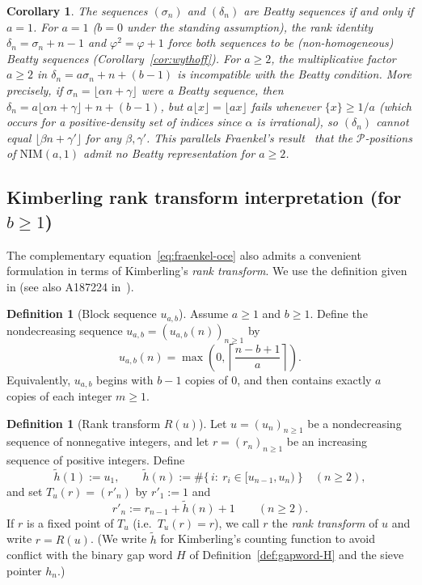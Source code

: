 \documentclass[11pt]{article}
\numberwithin{equation}{section}
\theoremstyle{plain}
\newtheorem{corollary}[theorem]{Corollary}
\theoremstyle{definition}
\newtheorem{definition}[theorem]{Definition}
\theoremstyle{remark}
\begin{document}
\begin{corollary}\label{cor:beatty-dichotomy}
The sequences $(\sigma_n)$ and $(\delta_n)$ are Beatty sequences if and only if $a=1$.
For $a=1$ ($b=0$ under the standing assumption), the rank identity $\delta_n=\sigma_n+n-1$
and $\varphi^2=\varphi+1$ force both sequences to be (non-homogeneous) Beatty sequences
(Corollary~\ref{cor:wythoff}).
For $a\ge2$, the multiplicative factor $a\ge2$ in $\delta_n=a\sigma_n+n+(b-1)$
is incompatible with the Beatty condition.  More precisely, if $\sigma_n=\lfloor\alpha n+\gamma\rfloor$
were a Beatty sequence, then $\delta_n = a\lfloor\alpha n+\gamma\rfloor+n+(b-1)$, but
$a\lfloor x\rfloor = \lfloor ax\rfloor$ fails whenever $\{x\}\ge 1/a$ (which occurs for
a positive-density set of indices since $\alpha$ is irrational), so $(\delta_n)$ cannot equal
$\lfloor\beta n+\gamma'\rfloor$ for any $\beta,\gamma'$.
This parallels Fraenkel's result~\cite{Fraenkel1998} that the $\mathcal{P}$-positions
of $\mathrm{NIM}(a,1)$ admit no Beatty representation for $a\ge2$.
\end{corollary}

\subsection{Kimberling rank transform interpretation (for \texorpdfstring{$b\ge1$}{b>=1})}

The complementary equation~\eqref{eq:fraenkel-oce} also admits a convenient formulation in terms of
Kimberling's \emph{rank transform}. We use the definition given in
\cite{Kimberling2011} (see also A187224 in~\cite{OEIS}).

\begin{definition}[Block sequence $u_{a,b}$]\label{def:uab}
Assume $a\ge1$ and $b\ge1$. Define the nondecreasing sequence
$u_{a,b}=(u_{a,b}(n))_{n\ge1}$ by
\[
  u_{a,b}(n)=\max\!\left(0,\left\lceil\frac{n-b+1}{a}\right\rceil\right).
\]
Equivalently, $u_{a,b}$ begins with $b-1$ copies of $0$, and then contains
exactly $a$ copies of each integer $m\ge1$.
\end{definition}

\begin{definition}[Rank transform $R(u)$]\label{def:ranktransform-new}
Let $u=(u_n)_{n\ge1}$ be a nondecreasing sequence of nonnegative integers, and
let $r=(r_n)_{n\ge1}$ be an increasing sequence of positive integers. Define
\[
  \tilde h(1):=u_1,\qquad
  \tilde h(n):=\#\{\,i:\ r_i\in[u_{n-1},u_n)\ \}\quad(n\ge2),
\]
and set $T_u(r)=(r'_n)$ by $r'_1:=1$ and
\[
  r'_n:=r_{n-1}+\tilde h(n)+1\qquad(n\ge2).
\]
If $r$ is a fixed point of $T_u$ (i.e.\ $T_u(r)=r$), we call $r$ the
\emph{rank transform} of $u$ and write $r=R(u)$.
(We write $\tilde h$ for Kimberling's counting function to avoid conflict
with the binary gap word $H$ of Definition~\ref{def:gapword-H} and the
sieve pointer $h_n$.)
\end{definition}
\end{document}
